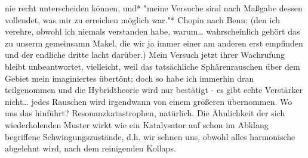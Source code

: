 \documentclass[
]{article}
\begin{document}
nie recht unterscheiden können, und* "meine Versuche sind nach Maßgabe
dessen vollendet, was mir zu erreichen möglich war."* Chopin nach Benn;
(den ich verehre, obwohl ich niemals verstanden habe, warum\ldots{}
wahrscheinlich gehört das zu unserm gemeinsamn Makel, die wir ja immer
einer am anderen erst empfinden und der endliche dritte lacht darüber.)
Mein Versuch jetzt ihrer Wachrufung bleibt unbeantwortet, vielleicht,
weil das tatsächliche Sphärenrauschen über dem Gebiet mein imaginiertes
übertönt; doch so habe ich immerhin dran teilgenommen und die
Hybridtheorie wird nur bestätigt - es gibt echte Verstärker
nicht\ldots{} jedes Rauschen wird irgendwann von einem größeren
übernommen. Wo uns das hinführt? Resonanzkatastrophen, natürlich. Die
Ähnlichkeit der sich wiederholenden Muster wirkt wie ein Katalysator auf
schon im Abklang begriffene Schwingungszustände, d.h. wir sehnen uns,
obwohl alles harmonische abgelehnt wird, nach dem reinigenden Kollaps.
\end{document}
